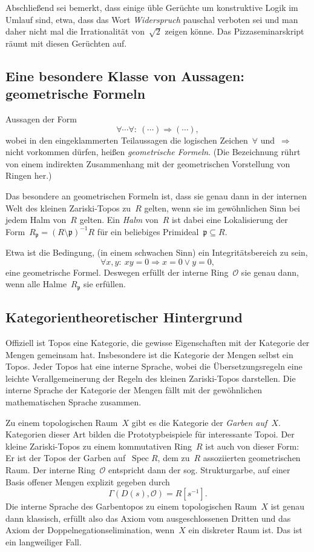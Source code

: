 \documentclass[a4paper,ngerman,12pt]{scrartcl}
\theoremstyle{definition}
\theoremstyle{plain}
\theoremstyle{remark}
\newcommand{\pp}{\mathfrak{p}}
\renewcommand{\O}{\mathcal{O}}
\DeclareMathOperator{\Spec}{Spec}
\renewcommand{\_}{\mathpunct{.}\,}
\newcommand{\?}{\,{:}\,}
\begin{document}
Abschließend sei bemerkt, dass einige üble Gerüchte um konstruktive Logik im
Umlauf sind, etwa, dass das Wort \emph{Widerspruch} pauschal verboten sei und
man daher nicht mal die Irrationalität von~$\sqrt{2}$ zeigen könne. Das
Pizzaseminarskript räumt mit diesen Gerüchten auf.


\subsection*{Eine besondere Klasse von Aussagen: geometrische Formeln}

Aussagen der Form
\[ \forall \cdots \forall{:}\ (\cdots) \Rightarrow (\cdots), \]
wobei in den eingeklammerten Teilaussagen die logischen Zeichen~$\forall$
und~$\Rightarrow$ nicht vorkommen dürfen, heißen \emph{geometrische Formeln}.
(Die Bezeichnung rührt von einem indirekten Zusammenhang mit der geometrischen
Vorstellung von Ringen her.)

Das besondere an geometrischen Formeln ist, dass sie genau dann in der internen
Welt des kleinen Zariski-Topos zu~$R$ gelten, wenn sie im gewöhnlichen Sinn bei
jedem Halm von~$R$ gelten. Ein \emph{Halm} von~$R$ ist dabei eine Lokalisierung
der Form~$R_\pp = (R \setminus \pp)^{-1}R$ für ein beliebiges Primideal~$\pp
\subseteq R$.

Etwa ist die Bedingung, (in einem schwachen Sinn) ein Integritätsbereich zu
sein,
\[ \forall x,y{:}\ xy = 0 \Rightarrow x = 0 \vee y = 0, \]
eine geometrische Formel. Deswegen erfüllt der interne Ring~$\O$ sie genau
dann, wenn alle Halme~$R_\pp$ sie erfüllen.



\subsection*{Kategorientheoretischer Hintergrund}

Offiziell ist Topos eine Kategorie, die gewisse Eigenschaften mit der
Kategorie der Mengen gemeinsam hat. Insbesondere ist die Kategorie der Mengen
selbst ein Topos. Jeder Topos hat eine interne Sprache, wobei die
Übersetzungsregeln eine leichte Verallgemeinerung der Regeln des kleinen
Zariski-Topos darstellen. Die interne Sprache der Kategorie der Mengen fällt
mit der gewöhnlichen mathematischen Sprache zusammen.

Zu einem topologischen Raum~$X$ gibt es die Kategorie der \emph{Garben
auf~$X$}. Kategorien dieser Art bilden die Prototypbeispiele für interessante
Topoi. Der kleine Zariski-Topos zu einem kommutativen Ring~$R$ ist auch von
dieser Form: Er ist der Topos der Garben auf~$\Spec R$, dem zu~$R$ assoziierten
geometrischen Raum. Der interne Ring~$\O$ entspricht dann der sog.
Strukturgarbe, auf einer Basis offener Mengen explizit gegeben durch
\[ \Gamma(D(s), \O) = R[s^{-1}]. \]
Die interne Sprache des Garbentopos zu einem topologischen Raum~$X$ ist genau
dann klassisch, erfüllt also das Axiom vom ausgeschlossenen Dritten und das
Axiom der Doppelnegationselimination, wenn~$X$ ein diskreter Raum ist. Das ist
ein langweiliger Fall.
\end{document}

